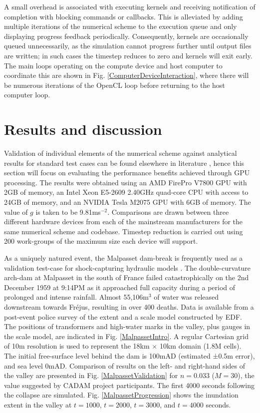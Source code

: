 \documentclass[11pt,english,a4paper]{article}
\begin{document}
A small overhead is associated with executing kernels and receiving notification of completion with blocking commands or callbacks. This is alleviated by adding multiple iterations of the numerical scheme to the execution queue and only displaying progress feedback periodically. Consequently, kernels are occasionally queued unnecessarily, as the simulation cannot progress further until output files are written; in such cases the timestep reduces to zero and kernels will exit early. The main loops operating on the compute device and host computer to coordinate this are shown in Fig. \ref{ComputerDeviceInteraction}, where there will be numerous iterations of the OpenCL loop before returning to the host computer loop.

\section{Results and discussion}

Validation of individual elements of the numerical scheme against analytical results for standard test cases can be found elsewhere in literature \cite{Liang_10,Liang_09}, hence this section will focus on evaluating the performance benefits achieved through GPU processing. The results were obtained using an AMD FirePro V7800 GPU with 2GB of memory, an Intel Xeon E5-2609 2.40GHz quad-core CPU with access to 24GB of memory, and an NVIDIA Tesla M2075 GPU with 6GB of memory. The value of \(g\) is taken to be 9.81ms\(^{-2}\). Comparisons are drawn between three different hardware devices from each of the mainstream manufacturers for the same numerical scheme and codebase. Timestep reduction is carried out using 200 work-groups of the maximum size each device will support.

As a uniquely natured event, the Malpasset dam-break is frequently used as a validation test-case for shock-capturing hydraulic models \cite{Goutal_99}. The double-curvature arch-dam at Malpasset in the south of France failed catastrophically on the 2nd December 1959 at 9:14PM as it approached full capacity during a period of prolonged and intense rainfall. Almost 55,106m\(^{3}\) of water was released downstream towards Fr{\'e}jus, resulting in over 400 deaths. Data is available from a post-event police survey of the extent and a scale model constructed by EDF. The positions of transformers and high-water marks in the valley, plus gauges in the scale model, are indicated in Fig. \ref{MalpassetIntro}. A regular Cartesian grid of 10m resolution is used to represent the 18km \(\times\) 10km domain (1.8M cells). The initial free-surface level behind the dam is 100mAD (estimated ±0.5m error), and sea level 0mAD. Comparison of results on the left- and right-hand sides of the valley are presented in Fig. \ref{MalpassetValidation} for \(n=0.033\) (\(M=30\)), the value suggested by CADAM project participants.  The first 4000 seconds following the collapse are simulated. Fig. \ref{MalpassetProgression} shows the inundation extent in the valley at \(t=1000\), \(t=2000\), \(t=3000\), and \(t=4000\) seconds.
\end{document}
